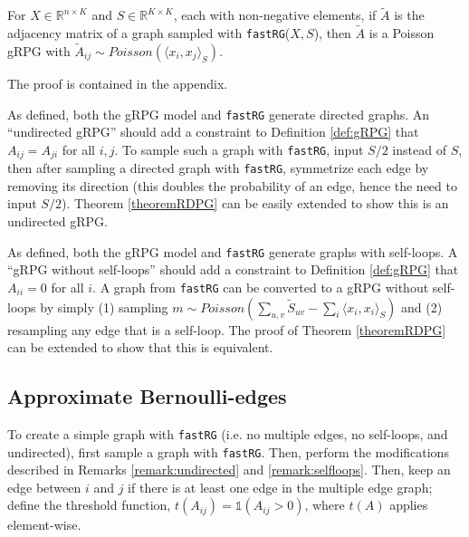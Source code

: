 \documentclass[twoside,11pt]{article}
\begin{document}
\begin{theorem} 
For $X \in \mathds{R}^{n \times K}$ and $S\in \mathds{R}^{K \times K}$, each with non-negative elements, if $\tilde A$ is the adjacency matrix of a graph sampled with \texttt{fastRG}($X,S$), then $\tilde A$ is a Poisson gRPG with $\tilde A_{ij} \sim Poisson(\langle x_i,x_j \rangle _S )$.
\label{theoremRDPG}
\end{theorem}
\noindent The proof is contained in the appendix.


\begin{remark}
\label{remark:undirected}
As defined, both the gRPG model and \texttt{fastRG} generate directed graphs. An ``undirected gRPG'' should add a constraint to Definition \ref{def:gRPG} that $A_{ij} = A_{ji}$ for all $i,j$.  To sample such a graph with \texttt{fastRG}, input $S/2$ instead of $S$, then after sampling a directed graph with \texttt{fastRG}, symmetrize each edge by removing its direction (this doubles the probability of an edge, hence the need to input $S/2$).  Theorem \ref{theoremRDPG} can be easily extended to show this is an undirected gRPG.
\end{remark}

\begin{remark}
\label{remark:selfloops}
As defined, both the gRPG model and \texttt{fastRG} generate graphs with self-loops. A ``gRPG without self-loops'' should add a constraint to Definition \ref{def:gRPG} that $A_{ii} = 0$ for all $i$.  A graph from \texttt{fastRG} can be converted to a gRPG without self-loops by simply (1) sampling $m \sim Poisson(\sum_{u,v} \tilde S_{uv} - \sum_i \langle x_i, x_i \rangle_S)$ and (2) resampling any edge that is a self-loop.
The proof of Theorem \ref{theoremRDPG} can be extended to show that this is equivalent.
\end{remark}



\subsection{Approximate Bernoulli-edges}
\label{approximate} 
To create a simple graph with \texttt{fastRG} (i.e. no multiple edges, no self-loops, and undirected), first sample a graph with \texttt{fastRG}.  Then, perform the modifications described in Remarks \ref{remark:undirected} and \ref{remark:selfloops}. Then, keep an edge between $i$ and $j$ if there is at least one edge in the multiple edge graph;  define the threshold function, $t(A_{ij})=\mathds{1}(A_{ij}>0)$, where $t(A)$ applies element-wise. 
\end{document}

